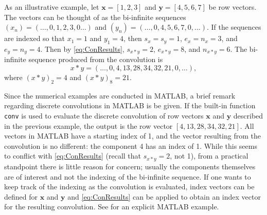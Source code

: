 \documentclass[12pt]{book}
\begin{document}
As an illustrative example, let $\mathbf{x} = [1,2,3]$ and $\mathbf{y} = [4,5,6,7]$ be row vectors. The vectors can be thought of as the bi-infinite sequences $(x_n) = (\ldots,0,1,2,3,0\ldots)$ and $(y_n) = (\ldots,0,4,5,6,7,0,\ldots)$. If the sequences are indexed so that $x_1 = 1$ and $y_1 = 4$, then $s_x = s_y = 1$, $e_x = n_x = 3$, and $e_y = n_y = 4$. Then by \eqref{eq:ConResults}, $s_{x*y} = 2$, $e_{x*y} = 8$, and $n_{x*y} = 6$. The bi-infinite sequence produced from the convolution is
\[x*y = (\ldots,0,4,13,28,34,32,21,0,\ldots),\]
where $(x*y)_2 = 4$ and $(x*y)_8 = 21$. \par 
Since the numerical examples are conducted in MATLAB, a brief remark regarding discrete convolutions in MATLAB is be given. If the built-in function \texttt{conv} is used to evaluate the discrete convolution of row vectors $\mathbf{x}$ and $\mathbf{y}$ described in the previous example, the output is the row vector $[4,13,28,34,32,21]$.  All vectors in MATLAB have a starting index of 1, and the vector resulting from the convolution is no different: the component 4 has an index of 1. While this seems to conflict with \eqref{eq:ConResults} (recall that $s_{x*y} = 2$, not 1), from a practical standpoint there is little reason for concern; usually the components themselves are of interest and not the indexing of the bi-infinite sequence. If one wants to keep track of the indexing as the convolution is evaluated, index vectors can be defined for $\mathbf{x}$ and $\mathbf{y}$ and \eqref{eq:ConResults} can be applied to obtain an index vector for the resulting convolution. See \cite{BoggessAlbert2001Afci} for an explicit MATLAB example. \par 
\end{document}
